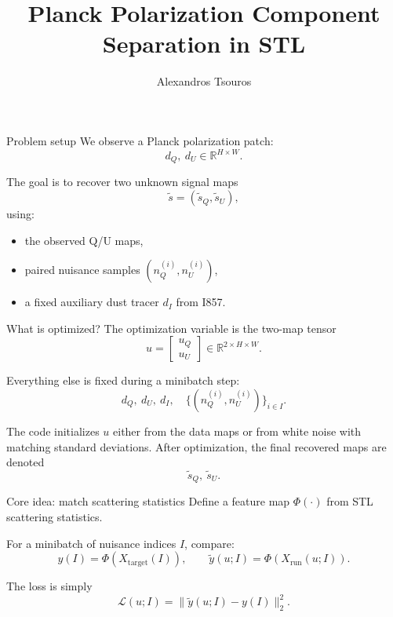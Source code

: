 \documentclass[aspectratio=169,11pt]{beamer}
\title[Planck Polarization Separation]{Planck Polarization Component Separation in STL}
\author{Alexandros Tsouros}
\date{}
\begin{document}
\begin{frame}[fragile]
  \titlepage
\end{frame}

\begin{frame}[fragile]{Problem setup}
We observe a Planck polarization patch:
\[
  d_Q,\ d_U\in\mathbb{R}^{H\times W}.
\]

\vspace{0.25em}
The goal is to recover two unknown signal maps
\[
  \tilde s=(\tilde s_Q,\tilde s_U),
\]
using:
\begin{itemize}
  \item the observed Q/U maps,
  \item paired nuisance samples $(n_Q^{(i)},n_U^{(i)})$,
  \item a fixed auxiliary dust tracer $d_I$ from I857.
\end{itemize}
\end{frame}

\begin{frame}[fragile]{What is optimized?}
The optimization variable is the two-map tensor
\[
  u=\begin{bmatrix}u_Q\\u_U\end{bmatrix}\in\mathbb{R}^{2\times H\times W}.
\]

\vspace{0.25em}
Everything else is fixed during a minibatch step:
\[
  d_Q,\ d_U,\ d_I,\quad \{(n_Q^{(i)},n_U^{(i)})\}_{i\in I}.
\]

\vspace{0.25em}
The code initializes $u$ either from the data maps or from white noise with matching standard deviations.
After optimization, the final recovered maps are denoted
\[
  \tilde s_Q,\ \tilde s_U.
\]
\end{frame}

\begin{frame}[fragile]{Core idea: match scattering statistics}
Define a feature map $\Phi(\cdot)$ from STL scattering statistics.

\vspace{0.35em}
For a minibatch of nuisance indices $I$, compare:
\[
  y(I)=\Phi\!\left(X_{\mathrm{target}}(I)\right),
  \qquad
  \tilde y(u;I)=\Phi\!\left(X_{\mathrm{run}}(u;I)\right).
\]

\vspace{0.25em}
The loss is simply
\[
  \mathcal{L}(u;I)=\|\tilde y(u;I)-y(I)\|_2^2.
\]
\end{frame}
\end{document}
